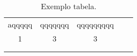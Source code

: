 \begin{table}[H]
    \centering
    \caption[Exemplo tabela]{Exemplo tabela.\label{tab:exetab}}
    \begin{tabular}{lllll}
\cline{1-4}
\multicolumn{1}{|l|}{aqqqqq} & \multicolumn{1}{l|}{qqqqqqq} & \multicolumn{1}{l|}{qqqqqqqqq} & \multicolumn{1}{l|}{} &  \\ \cline{1-4}
\multicolumn{1}{|c|}{1}      & \multicolumn{1}{c|}{3}       & \multicolumn{1}{c|}{3}         & \multicolumn{1}{l|}{} &  \\ \cline{1-4}
                             &                              &                                &                       &  \\
                             &                              &                                &                       & 
\end{tabular}
\end{table}
\vspace*{-0,9cm}
{\raggedright {}}